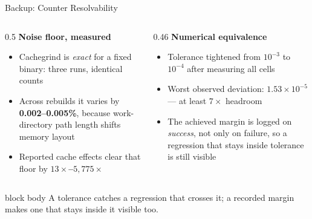 \documentclass[10pt,aspectratio=169]{beamer}
\begin{document}
\begin{frame}{Backup: Counter Resolvability}
\begin{columns}[T,totalwidth=0.99\textwidth]
\begin{column}{0.5\textwidth}
\textbf{Noise floor, measured}
\begin{itemize}
\small
\item Cachegrind is \emph{exact} for a fixed binary: three runs, identical counts
\item Across rebuilds it varies by \textbf{0.002--0.005\%}, because work-directory path length shifts memory layout
\item Reported cache effects clear that floor by \textbf{$13\times$--$5{,}775\times$}
\end{itemize}
\end{column}

\begin{column}{0.46\textwidth}
\textbf{Numerical equivalence}
\begin{itemize}
\small
\item Tolerance tightened from $10^{-3}$ to $10^{-4}$ after measuring all cells
\item Worst observed deviation: $1.53\times10^{-5}$ --- at least $7\times$ headroom
\item The achieved margin is logged on \emph{success}, not only on failure, so a regression that stays inside tolerance is still visible
\end{itemize}
\end{column}
\end{columns}

\vspace{0.25cm}
\begin{beamercolorbox}[sep=0.35em,center,rounded=true,shadow=true]{block body}
\small
A tolerance catches a regression that crosses it; a recorded margin makes one that stays inside it visible too.
\end{beamercolorbox}
\end{frame}
\end{document}
